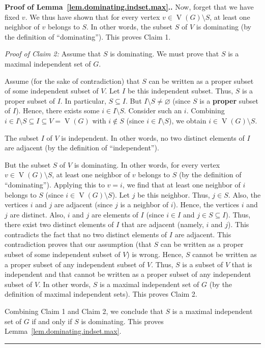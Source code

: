 \documentclass[numbers=enddot,12pt,final,onecolumn,notitlepage]{scrartcl}%
\theoremstyle{definition}
\newenvironment{proof}[1][Proof]{\noindent\textbf{#1.} }{\ \rule{0.5em}{0.5em}}
\newcommand{\verts}[1]{\operatorname{V}\left( #1 \right)}
\begin{document}
\begin{proof}[Proof of Lemma~\ref{lem.dominating.indset.max}.]
Now, forget that we have fixed $v$. We thus have shown that for
every vertex $v \in \verts{G} \setminus S$, at least one neighbor of
$v$ belongs to $S$. In other words, the subset $S$ of $V$ is
dominating (by the definition of ``dominating''). This proves Claim 1.

\textit{Proof of Claim 2:} Assume that $S$ is dominating. We must
prove that $S$ is a maximal independent set of $G$.

Assume (for the sake of contradiction) that $S$ can be written as a
proper subset of some independent subset of $V$. Let $I$ be this
independent subset. Thus, $S$ is a proper subset of $I$. In
particular, $S \subseteq I$. But $I \setminus S \neq \varnothing$
(since $S$ is a \textbf{proper} subset of $I$). Hence, there exists
some $i \in I \setminus S$. Consider such an $i$. Combining
$i \in I \setminus S \subseteq I \subseteq V = \verts{G}$ with
$i \notin S$ (since $i \in I \setminus S$), we obtain
$i \in \verts{G} \setminus S$.

The subset $I$ of $V$ is independent. In other words, no two distinct
elements of $I$ are adjacent (by the definition of ``independent'').

But the subset $S$ of $V$ is dominating. In other words, for
every vertex $v \in \verts{G} \setminus S$, at least one neighbor of
$v$ belongs to $S$ (by the definition of ``dominating''). Applying
this to $v = i$, we find that at least one neighbor of $i$ belongs to
$S$ (since $i \in \verts{G} \setminus S$). Let $j$ be this neighbor.
Thus, $j \in S$. Also, the vertices $i$ and $j$ are adjacent (since
$j$ is a neighbor of $i$). Hence, the vertices $i$ and $j$ are
distinct. Also, $i$ and $j$ are elements of $I$ (since $i \in I$ and
$j \in S \subseteq I$). Thus, there exist two distinct elements of $I$
that are adjacent (namely, $i$ and $j$). This contradicts the fact
that no two distinct elements of $I$ are adjacent. This contradiction
proves that our assumption (that $S$ can be written as a proper subset
of some independent subset of $V$) is wrong. Hence, $S$ cannot be
written as a proper subset of any independent subset of $V$. Thus,
$S$ is a subset of $V$ that is independent and that cannot be written
as a proper subset of any independent subset of $V$.
In other words, $S$ is a maximal independent set of $G$ (by the
definition of maximal independent sets). This proves Claim 2.

Combining Claim 1 and Claim 2, we conclude that $S$ is a maximal
independent set of $G$ if and only if $S$ is dominating. This proves
Lemma~\ref{lem.dominating.indset.max}.
\end{proof}
\end{document}
